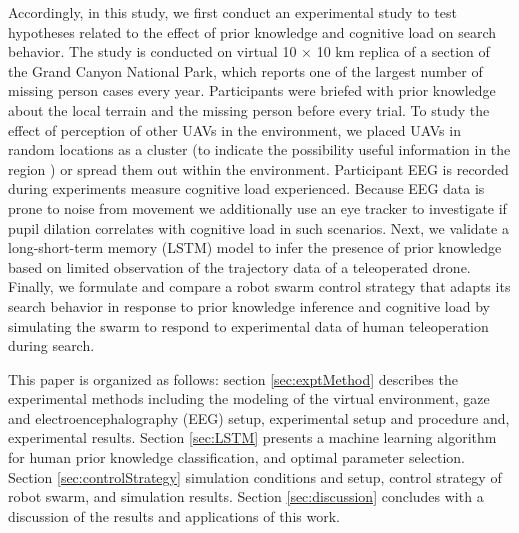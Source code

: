\documentclass{article}
\begin{document}
Accordingly, in this study, we first conduct an experimental study to test hypotheses related to the effect of prior knowledge and cognitive load on search behavior. The study is conducted on virtual 10 $\times$ 10 km replica of a section of the Grand Canyon National Park, which reports one of the largest number of missing person cases every year. Participants were briefed with prior knowledge about the local terrain and the missing person before every trial. To study the effect of perception of other UAVs in the environment, we placed UAVs in random locations as a cluster (to indicate the possibility useful information in the region \cite{st2019collective}) or spread them out within the environment. Participant EEG is recorded during experiments  measure cognitive load experienced. Because EEG data is prone to noise from movement we additionally use an eye tracker to investigate if pupil dilation correlates with cognitive load in such scenarios. Next, we validate a long-short-term memory (LSTM) model to infer the presence of prior knowledge based on limited observation of the trajectory data of a teleoperated drone. Finally, we formulate and compare a robot swarm control strategy that adapts its search behavior in response to prior knowledge inference and cognitive load by simulating the swarm to respond to experimental data of human teleoperation during search.
	




This paper is organized as follows: section \ref{sec:exptMethod} describes the experimental methods including the modeling of the virtual environment, gaze and electroencephalography (EEG) setup, experimental setup and procedure and, experimental results. Section \ref{sec:LSTM} presents a machine learning algorithm for human prior knowledge classification, and optimal parameter selection. Section \ref{sec:controlStrategy} simulation conditions and setup, control strategy of robot swarm, and simulation results. Section \ref{sec:discussion} concludes with a discussion of the results and applications of this work.
\end{document}
